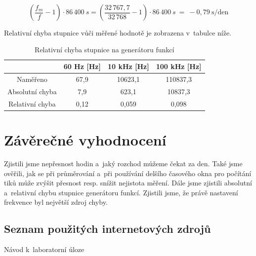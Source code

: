 \documentclass[a4paper,12pt]{article}   %
\begin{document}
\begin{equation}
  \left(\frac{f_m}{f}-1\right)\cdot 86\,400~s = \left(\frac{32\,767,7}{32\,768}-1\right)\cdot 86\,400~s~=~-0,79~\textrm{s/den}
  \label{eq:presnost_f}
\end{equation}

Relativní chyba stupnice vůči měřené hodnotě je zobrazena v~tabulce níže.

\begin{table}[h!]
  \centering
  \begin{tabular}{|c|c|c|c|}
    \hline
    &60 Hz [Hz]&10 kHz [Hz]&100 kHz [Hz]\\\hline\hline
    Naměřeno&67,9&10623,1&110837,3\\\hline
    Absolutní chyba&7,9&623,1&10837,3\\\hline\hline
    Relativní chyba&0,12&0,059&0,098\\\hline
  \end{tabular}
  \label{tab:chyba}
  \caption{Relativní chyba stupnice na generátoru funkcí}
\end{table}

\section{Závěrečné vyhodnocení}
Zjistili jsme nepřesnost hodin a~jaký rozchod můžeme čekat za den. Také jsme ověřili, jak se při průměrování a~při používání delšího časového okna pro počítání tiků může zvýšit přesnost resp. snížit nejistota měření. Dále jsme zjistili absolutní a~relativní chybu stupnice generátoru funkcí. Zjistili jsme, že právě nastavení frekvence byl největší zdroj chyby.

\clearpage
\renewcommand{\refname}{Seznam použité literatury a~zdrojů informací} 

\begin{thebibliography}{99}

\subsection*{Seznam použitých internetových zdrojů}
     Návod k~laboratorní úloze
    
\end{thebibliography}
\end{document}
